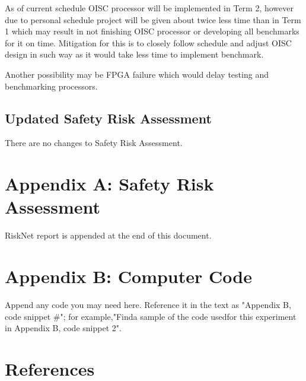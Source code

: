 \documentclass[a4paper,12pt]{article}
\begin{document}
\begin{multicols}{2}
As of current schedule OISC processor will be implemented in Term 2, however due to personal schedule project will be given about twice less time than in Term 1 which may result in not finishing OISC processor or developing all benchmarks for it on time. Mitigation for this is to closely follow schedule and adjust OISC design in such way as it would take less time to implement benchmark.

Another possibility may be FPGA failure which would delay testing and benchmarking processors.

\subsection{Updated Safety Risk Assessment}
There are no changes to Safety Risk Assessment.

\end{multicols}

\section{Appendix A: Safety Risk Assessment}
RiskNet report is appended at the end of this document.

\section{Appendix B: Computer Code}
Append any code you may need here. Reference it in the text as "Appendix B, code snippet \#"; for example,"Finda sample of the code usedfor this experiment in Appendix B, code snippet 2".

\section{References}
\printbibliography

%
\end{document}
